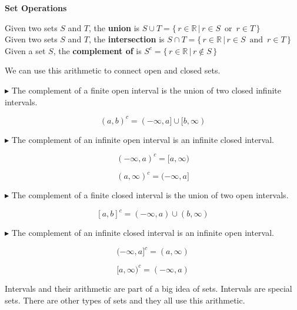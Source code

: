 \documentclass{ximera}
\begin{document}
\begin{definition} \textbf{\textcolor{green!50!black}{Set Operations}} 


Given two sets $S$ and $T$, the \textbf{union} is $S \cup T = \{ \, r \in \mathbb{R} \, | \, r \in S \, \text{ or } \, r \in T  \,   \}$ \\

Given two sets $S$ and $T$, the \textbf{intersection} is $S \cap T = \{ \, r \in \mathbb{R} \, | \, r \in S \, \text{ and } \, r \in T  \,   \}$ \\
 
Given a set $S$, the \textbf{complement of} is $S^{c}  = \{ \, r \in \mathbb{R} \, | \, r \not\in S \,  \}$ 


\end{definition}







We can use this arithmetic to connect open and closed sets.

$\blacktriangleright$ The complement of a finite open interval is the union of two closed infinite intervals.

\[    (a,b)^{c}  = (-\infty, a] \cup [b, \infty)          \]



$\blacktriangleright$ The complement of an infinite open interval is an infinite closed interval.

\[     (-\infty, a)^{c} = [a, \infty)          \]

\[     (a, \infty)^{c} = (-\infty, a]          \]



$\blacktriangleright$ The complement of a finite closed interval is the union of two open intervals.

\[    [a,b]^{c}  = (-\infty, a) \cup (b, \infty)          \]



$\blacktriangleright$ The complement of an infinite closed interval is an infinite open interval.

\[     (-\infty, a]^{c} = (a, \infty)          \]

\[     [a, \infty)^{c} = (-\infty, a)          \]









Intervals and their arithmetic are part of a big idea of sets.  Intervals are special sets.  There are other types of sets and they all use this arithmetic.
\end{document}
